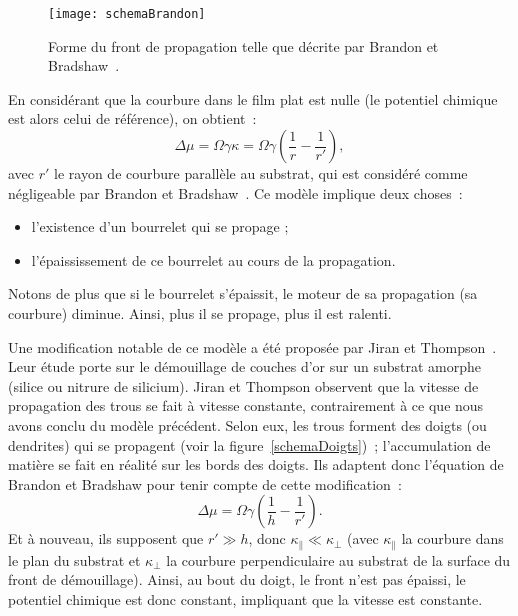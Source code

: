 \begin{figure}[!htb]
	\centering
	\texttt{[image: schemaBrandon]}
	\caption{Forme du front de propagation telle que décrite par Brandon et Bradshaw~\cite{brandon1966mobility}.}
	\label{schemaBrandon}
\end{figure}

En considérant que la courbure dans le film plat est nulle (le potentiel chimique est alors celui de référence), on obtient~:
\begin{equation}
\Delta \mu = \Omega\gamma\kappa = \Omega\gamma\left(\dfrac{1}{r}-\dfrac{1}{r'}\right),
\end{equation}
avec $r'$ le rayon de courbure parallèle au substrat, qui est considéré comme négligeable par Brandon et Bradshaw~\cite{brandon1966mobility}. Ce modèle implique deux choses~:
\begin{itemize}
\item l'existence d'un bourrelet qui se propage ;
\item l'épaississement de ce bourrelet au cours de la propagation.
\end{itemize}
Notons de plus que si le bourrelet s'épaissit, le moteur de sa propagation (sa courbure) diminue. Ainsi, plus il se propage, plus il est ralenti.\par 
Une modification notable de ce modèle a été proposée par Jiran et Thompson~\cite{jiran1990capillary, jiran1992capillary}. Leur étude porte sur le démouillage de couches d'or sur un substrat amorphe (silice ou nitrure de silicium). Jiran et Thompson observent que la vitesse de propagation des trous se fait à vitesse constante, contrairement à ce que nous avons conclu du modèle précédent. Selon eux, les trous forment des doigts (ou dendrites) qui se propagent (voir la figure~\ref{schemaDoigts})~; l'accumulation de matière se fait en réalité sur les bords des doigts. Ils adaptent donc l'équation de Brandon et Bradshaw pour tenir compte de cette modification~:
\begin{equation}
\Delta \mu = \Omega\gamma\left(\dfrac{1}{h}-\dfrac{1}{r'}\right).
\end{equation}
Et à nouveau, ils supposent que $r' \gg h$, donc $\kappa_\parallel \ll \kappa_\perp$ (avec $\kappa_\parallel$ la courbure dans le plan du substrat et $\kappa_\perp$ la courbure perpendiculaire au substrat de la surface du front de démouillage). Ainsi, au bout du doigt, le front n'est pas épaissi, le potentiel chimique est donc constant, impliquant que la vitesse est constante.\par 

